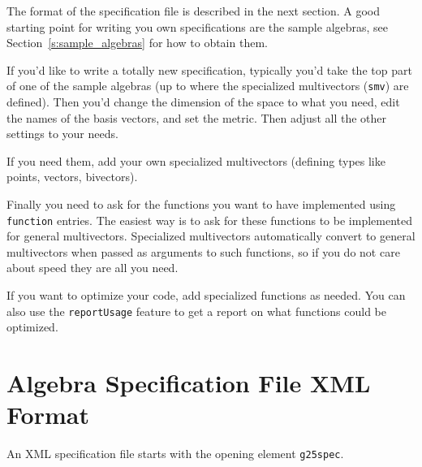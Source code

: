 \documentclass[10pt, a4paper]{article}
\begin{document}
The format of the specification file is described in the next section.
A good starting point for writing you own specifications are the sample algebras,
see Section~\ref{s:sample_algebras} for how to obtain them.

If you'd like to write a totally new specification, typically you'd take the top part
of one of the sample algebras (up to where the specialized multivectors ({\tt smv}) are defined).
Then you'd change the dimension of the space to what you need, edit the names of the basis
vectors, and set the metric. Then adjust all the other settings to your needs.

If you need them, add your own specialized multivectors (defining types like points,
vectors, bivectors). 

Finally you need to ask for the functions you want to have implemented using {\tt function} entries.
The easiest way is to ask for these functions to be implemented for general multivectors.
Specialized multivectors automatically convert to general multivectors when passed
as arguments to such functions, so if you do not care about speed they are all you need.

If you want to optimize your code, add specialized functions as needed. You can
also use the {\tt reportUsage} feature to get a report on what functions could be
optimized.

\section{Algebra Specification File XML Format}

An XML specification file starts with the opening element {\tt g25spec}.
\end{document}
